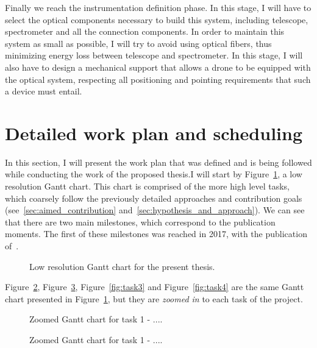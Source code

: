 Finally we reach the instrumentation definition phase. In this stage, I
will have to select the optical components necessary to build this
system, including telescope, spectrometer and all the connection
components. In order to maintain this system as small as possible, I
will try to avoid using optical fibers, thus minimizing energy loss
between telescope and spectrometer. In this stage, I will also have to
design a mechanical support that allows a drone to be equipped with the
optical system, respecting all positioning and pointing requirements
that such a device must entail.

\section{Detailed work plan and scheduling}%
\label{sec:detailed_work_plan_and_scheduling}

In this section, I will present the work plan that was defined and is
being followed while conducting the work of the proposed thesis.I will
start by Figure~\ref{fig:low_res_gantt}, a low resolution Gantt chart.
This chart is comprised of the more high level tasks, which coarsely
follow the previously detailed approaches and contribution goals
(see~\ref{sec:aimed_contribution}
and~\ref{sec:hypothesis_and_approach}). We can see that there are two
main milestones, which correspond to the publication moments. The first
of these milestones was reached in 2017, with the publication
of~\cite{ValentedeAlmeida2017}.

\begin{figure}[htpb]
    \centering
    \caption{Low resolution Gantt chart for the present thesis.}
    \label{fig:low_res_gantt}
\end{figure}

Figure~\ref{fig:task1}, Figure~\ref{fig:task2}, Figure~\ref{fig:task3}
and Figure~\ref{fig:task4} are the same Gantt chart presented in
Figure~\ref{fig:low_res_gantt}, but they are \emph{zoomed in} to each
task of the project.

\begin{figure}[htpb]
    \centering
    \missingfigure{}
    \caption{Zoomed Gantt chart for task 1 - ....}
    \label{fig:task1}
\end{figure}

\begin{figure}[htpb]
    \centering
    \missingfigure{}
    \caption{Zoomed Gantt chart for task 1 - ....}
    \label{fig:task2}
\end{figure}

